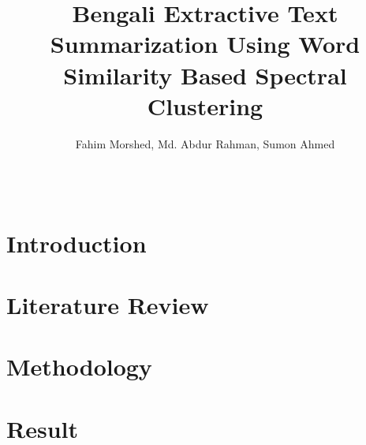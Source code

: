 \documentclass[11pt]{article}
\title{Bengali Extractive Text Summarization Using Word Similarity Based Spectral Clustering}
\author{Fahim Morshed, Md. Abdur Rahman, Sumon Ahmed}
\begin{document}
    \maketitle
    \setlength{\parindent}{0pt}
    \begin{abstract}
        \blindtext\\
    \end{abstract}

    \section{Introduction}\label{sec:introduction}
        

    \section{Literature Review}\label{sec:literature-review}
        

    \section{Methodology}\label{sec:methodology}
        

    \section{Result}\label{sec:result}
        


    
    
\end{document}
